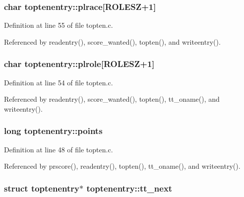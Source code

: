 \hypertarget{structtoptenentry_ad8638f544271de3f5d3e21d745fee726}{
\subsubsection[{plrace}]{\setlength{\rightskip}{0pt plus 5cm}char toptenentry\+::plrace\mbox{[}{\bf R\+O\+L\+E\+S\+Z}+1\mbox{]}}}\label{structtoptenentry_ad8638f544271de3f5d3e21d745fee726}


Definition at line 55 of file topten.\+c.



Referenced by readentry(), score\+\_\+wanted(), topten(), and writeentry().

\hypertarget{structtoptenentry_acd6a0949037e46d3e20d2d2965327fa6}{
\subsubsection[{plrole}]{\setlength{\rightskip}{0pt plus 5cm}char toptenentry\+::plrole\mbox{[}{\bf R\+O\+L\+E\+S\+Z}+1\mbox{]}}}\label{structtoptenentry_acd6a0949037e46d3e20d2d2965327fa6}


Definition at line 54 of file topten.\+c.



Referenced by readentry(), score\+\_\+wanted(), topten(), tt\+\_\+oname(), and writeentry().

\hypertarget{structtoptenentry_a6d848e2af2fe840605e707e914395584}{
\subsubsection[{points}]{\setlength{\rightskip}{0pt plus 5cm}long toptenentry\+::points}}\label{structtoptenentry_a6d848e2af2fe840605e707e914395584}


Definition at line 48 of file topten.\+c.



Referenced by prscore(), readentry(), topten(), tt\+\_\+oname(), and writeentry().

\hypertarget{structtoptenentry_ae73ae2ba838b18d1c8744f6c4735c768}{
\subsubsection[{tt\+\_\+next}]{\setlength{\rightskip}{0pt plus 5cm}struct {\bf toptenentry}$\ast$ toptenentry\+::tt\+\_\+next}}\label{structtoptenentry_ae73ae2ba838b18d1c8744f6c4735c768}


